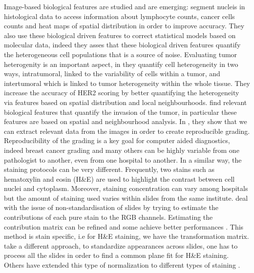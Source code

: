 \documentclass[a4paper,10pt]{article}
\begin{document}
Image-based biological features are studied and are emerging: \citet{yuan2012quantitative} segment nucleis in histological data to access information about lymphocyte counts, cancer cells counts and heat maps of spatial distribution in order to improve accuracy. They also use these biological driven features to correct statistical models based on molecular data, indeed they asses that these biological driven features quantify the heterogeneous cell populations that is a source of noise. Evaluating tumor heterogenity is an important aspect, in \citet{potts2012evaluating} they quantify cell heterogeneity in two ways, intratumoral, linked to the variability of cells within a tumor, and intertumoral which is linked to tumor heterogeneity within the whole tissue. They increase the accuracy of HER2 scoring by better quantifying the heterogeneity via features based on spatial distribution and local neighbourhoods. \citet{harder2016cooccurence} find relevant biological features that quantify the invasion of the tumor, in particular these features are based on spatial and neighbourhood analysis. In \citet{petushi2006large}, they show that we can extract relevant data from the images in order to create reproducible grading. Reproducibility of the grading is a key goal for computer aided diagnostics, indeed breast cancer grading and many others can be highly variable from one pathologist to another, even from one hospital to another. In a similar way, the staining protocols can be very different. Frequently, two stains such as hematoxylin and eosin (H\&E) are used to highlight the contrast between cell nuclei and cytoplasm. Moreover, staining concentration can vary among hospitals but the amount of staining used varies within slides from the same institute. \citet{deconvolution} deal with the issue of non-standardisation of slides by trying to estimate the contributions of each pure stain to the RGB channels. Estimating the contribution matrix can be refined and some achieve better performances \citep{alsubaie2016}. This method is stain specific, i.e for H\&E staining, we have the transformation matrix. \citet{niethammer2010appearance} take a different approach, to standardize appearances across slides, one has to process all the slides in order to find a common plane fit for H\&E staining. Others have extended this type of normalization to different types of staining \citep{vanEycke2016}. 
\end{document}
